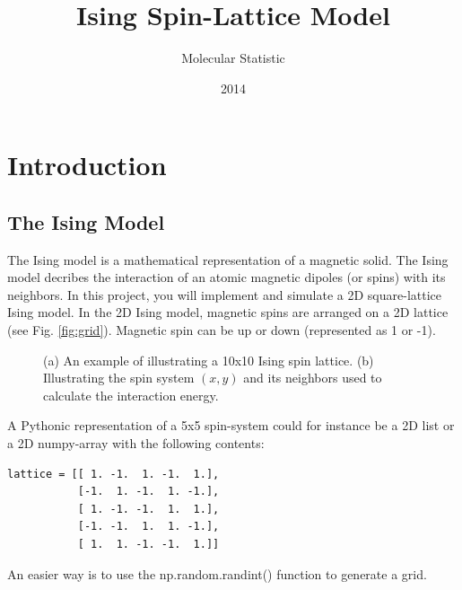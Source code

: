 \documentclass{article}
\title{Ising Spin-Lattice Model}
\author{Molecular Statistic}
\date{2014}
\begin{document}


\maketitle

\section{Introduction}

\subsection{The Ising Model}

The Ising model is a mathematical representation of a magnetic solid. The Ising model decribes the interaction of an atomic magnetic dipoles (or spins) with its neighbors. In this project, you will implement and simulate a 2D square-lattice Ising model.
In the 2D Ising model, magnetic spins are arranged on a 2D lattice (see Fig. \ref{fig:grid}).
Magnetic spin can be up or down (represented as 1 or -1). 

\begin{figure}[h!]
  \centering
  \qquad %
  \qquad %
  \qquad %
  \caption{
    (a) An example of illustrating a 10x10 Ising spin lattice.
    (b) Illustrating the spin system $(x,y)$ and its neighbors used to calculate
    the interaction energy.
  }
\end{figure}


A Pythonic representation of a 5x5 spin-system could for instance be a 2D list or a 2D numpy-array with the following contents:
\begin{lstlisting}
lattice = [[ 1. -1.  1. -1.  1.],
           [-1.  1. -1.  1. -1.],
           [ 1. -1. -1.  1.  1.],
           [-1. -1.  1.  1. -1.],
           [ 1.  1. -1. -1.  1.]]
\end{lstlisting}
An easier way is to use the np.random.randint() function to generate a grid.
\end{document}
